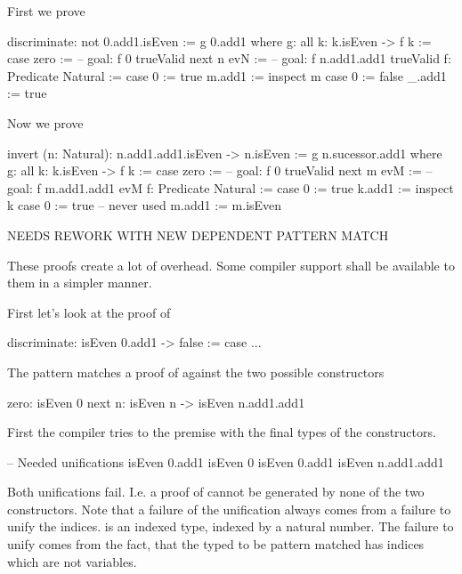 \noindent First we prove 
%
\begin{alba}
    discriminate: not 0.add1.isEven
    :=
        g 0.add1
        where
            g: all k: k.isEven -> f k :=
                case
                    zero :=
                        -- goal: f 0
                        trueValid
                    next n evN :=
                        -- goal: f n.add1.add1
                        trueValid
            f: Predicate Natural :=
                case
                    0 :=
                        true
                    m.add1 :=
                        inspect m case
                            0 :=
                                false
                            _.add1 :=
                                true
\end{alba}




\noindent Now we prove 
%
\begin{alba}
    invert (n: Natural): n.add1.add1.isEven -> n.isEven
    :=
        g n.sucessor.add1
        where
            g: all k: k.isEven -> f k :=
                case
                    zero :=
                        -- goal: f 0
                        trueValid
                    next m evM :=
                        -- goal: f m.add1.add1
                        evM
            f: Predicate Natural :=
                case
                    0 :=
                        true
                    k.add1 :=
                        inspect k case
                            0 :=
                                true -- never used
                            m.add1 :=
                                m.isEven
\end{alba}




\noindent NEEDS REWORK WITH NEW DEPENDENT PATTERN MATCH

These proofs create a lot of overhead. Some compiler support shall be available
to them in a simpler manner.

First let's look at the proof of
\begin{alba}
    discriminate: isEven 0.add1 -> false :=
        case ...
\end{alba}
The pattern matches a proof of  against the two
possible constructors
\begin{alba}
    zero: isEven 0
    next n: isEven n -> isEven n.add1.add1
\end{alba}
First the compiler tries to the premise with the final types of the
constructors.
\begin{alba}
    -- Needed unifications
    isEven 0.add1              isEven 0
    isEven 0.add1              isEven n.add1.add1
\end{alba}
Both unifications fail. I.e. a proof of  cannot be
generated by none of the two constructors. Note that a failure of the
unification always comes from a failure to unify the indices.  is
an indexed type, indexed by a natural number. The failure to unify comes from
the fact, that the typed to be pattern matched has indices which are not
variables.

